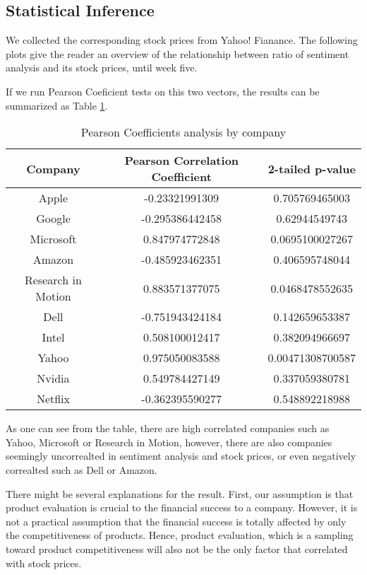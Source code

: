 \documentclass[12pt]{article}
\begin{document}
\subsection{Statistical Inference}
We collected the corresponding stock prices from Yahoo! Fianance. The following plots give the reader an overview of the relationship between ratio of sentiment analysis and its stock prices, until week five.

If we run Pearson Coeficient tests on this two vectors, the results can be summarized as Table \ref{coefficients-by-company}.

\begin{table}
\begin{center}
    \begin{tabular}{ | c || c | c | }
        \hline
        Company & Pearson Correlation Coefficient & 2-tailed p-value \\ \hline
        Apple & -0.23321991309 & 0.705769465003 \\ \hline
        Google & -0.295386442458 & 0.62944549743 \\ \hline
        Microsoft & 0.847974772848 & 0.0695100027267 \\ \hline
        Amazon & -0.485923462351 & 0.406595748044 \\ \hline
        Research in Motion & 0.883571377075 & 0.0468478552635 \\ \hline
        Dell & -0.751943424184 & 0.142659653387 \\ \hline
        Intel & 0.508100012417 & 0.382094966697 \\ \hline
        Yahoo & 0.975050083588 & 0.00471308700587 \\ \hline
        Nvidia & 0.549784427149 & 0.337059380781 \\ \hline
        Netflix & -0.362395590277 & 0.548892218988 \\ \hline
    \end{tabular}
\caption{Pearson Coefficients analysis by company}
\label{coefficients-by-company}
\end{center}
\end{table}

As one can see from the table, there are high correlated companies such as Yahoo, Microsoft or Research in Motion, however, there are also companies seemingly uncorrealted in sentiment analysis and stock prices, or even negatively correalted such as Dell or Amazon.

There might be several explanations for the result. First, our assumption is that product evaluation is crucial to the financial success to a company. However, it is not a practical assumption that the financial success is totally affected by only the competitiveness of products. Hence, product evaluation, which is a sampling toward product competitiveness will also not be the only factor that correlated with stock prices.
\end{document}
